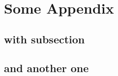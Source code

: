 \chapter{Some Appendix}

\minitoc%

\section{with subsection}
{
    
}
\section{and another one}
{
    
}